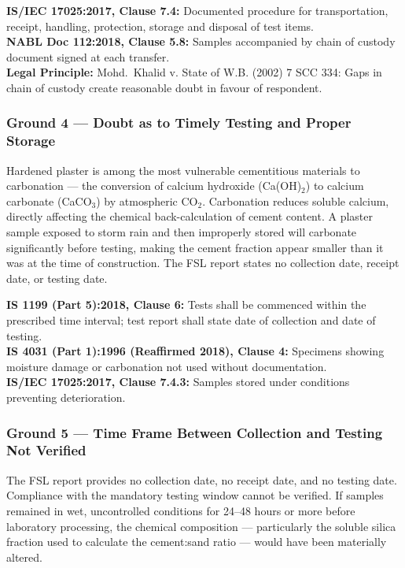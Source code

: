 \documentclass[12pt, a4paper]{article}
\begin{document}
\begin{standardbox}
\textbf{IS/IEC 17025:2017, Clause 7.4:} Documented procedure for transportation, receipt, handling, protection, storage and disposal of test items.\\
\textbf{NABL Doc 112:2018, Clause 5.8:} Samples accompanied by chain of custody document signed at each transfer.\\
\textbf{Legal Principle:} Mohd.\ Khalid v. State of W.B. (2002) 7 SCC 334: Gaps in chain of custody create reasonable doubt in favour of respondent.
\end{standardbox}

\subsubsection{Ground 4 --- Doubt as to Timely Testing and Proper Storage}

\begin{groundbox}
Hardened plaster is among the most vulnerable cementitious materials to carbonation --- the conversion of calcium hydroxide (Ca(OH)$_2$) to calcium carbonate (CaCO$_3$) by atmospheric CO$_2$. Carbonation reduces soluble calcium, directly affecting the chemical back-calculation of cement content. A plaster sample exposed to storm rain and then improperly stored will carbonate significantly before testing, making the cement fraction appear smaller than it was at the time of construction. The FSL report states no collection date, receipt date, or testing date.
\end{groundbox}

\begin{standardbox}
\textbf{IS 1199 (Part 5):2018, Clause 6:} Tests shall be commenced within the prescribed time interval; test report shall state date of collection and date of testing.\\
\textbf{IS 4031 (Part 1):1996 (Reaffirmed 2018), Clause 4:} Specimens showing moisture damage or carbonation not used without documentation.\\
\textbf{IS/IEC 17025:2017, Clause 7.4.3:} Samples stored under conditions preventing deterioration.
\end{standardbox}

\subsubsection{Ground 5 --- Time Frame Between Collection and Testing Not Verified}

The FSL report provides no collection date, no receipt date, and no testing date. Compliance with the mandatory testing window cannot be verified. If samples remained in wet, uncontrolled conditions for 24--48 hours or more before laboratory processing, the chemical composition --- particularly the soluble silica fraction used to calculate the cement:sand ratio --- would have been materially altered.
\end{document}
